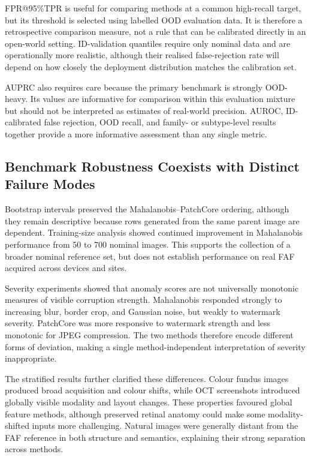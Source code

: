 \documentclass[fleqn,12pt]{olplainarticle}
\begin{document}
FPR@95\%TPR is useful for comparing methods at a common high-recall target,
but its threshold is selected using labelled OOD evaluation data. It is
therefore a retrospective comparison measure, not a rule that can be
calibrated directly in an open-world setting. ID-validation quantiles require
only nominal data and are operationally more realistic, although their
realised false-rejection rate will depend on how closely the deployment
distribution matches the calibration set.

AUPRC also requires care because the primary benchmark is strongly OOD-heavy.
Its values are informative for comparison within this evaluation mixture but
should not be interpreted as estimates of real-world precision. AUROC,
ID-calibrated false rejection, OOD recall, and family- or subtype-level
results together provide a more informative assessment than any single
metric.

\subsection{Benchmark Robustness Coexists with Distinct Failure Modes}
\label{subsec:discussion_robustness}

Bootstrap intervals preserved the Mahalanobis--PatchCore ordering, although
they remain descriptive because rows generated from the same parent image are
dependent. Training-size analysis showed continued improvement in
Mahalanobis performance from 50 to 700 nominal images. This supports the
collection of a broader nominal reference set, but does not establish
performance on real FAF acquired across devices and sites.

Severity experiments showed that anomaly scores are not universally monotonic
measures of visible corruption strength. Mahalanobis responded strongly to
increasing blur, border crop, and Gaussian noise, but weakly to watermark
severity. PatchCore was more responsive to watermark strength and less
monotonic for JPEG compression. The two methods therefore encode different
forms of deviation, making a single method-independent interpretation of
severity inappropriate.

The stratified results further clarified these differences. Colour fundus
images produced broad acquisition and colour shifts, while OCT screenshots
introduced globally visible modality and layout changes. These properties
favoured global feature methods, although preserved retinal anatomy could make
some modality-shifted inputs more challenging. Natural images were generally
distant from the FAF reference in both structure and semantics, explaining
their strong separation across methods.
\end{document}

